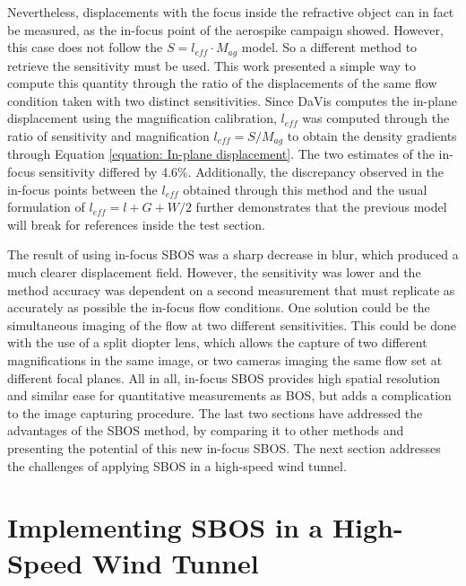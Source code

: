 Nevertheless, displacements with the focus inside the refractive object can in fact be measured, as the in-focus point of the aerospike campaign showed. However, this case does not follow the $S = l_{eff} \cdot M_{ag}$ model. So a different method to retrieve the sensitivity must be used. This work presented a simple way to compute this quantity through the ratio of the displacements of the same flow condition taken with two distinct sensitivities. Since DaVis computes the in-plane displacement using the magnification calibration, $l_{eff}$ was computed through the ratio of sensitivity and magnification $l_{eff} = S/M_{ag}$ to obtain the density gradients through Equation \ref{equation: In-plane displacement}. The two estimates of the in-focus sensitivity differed by 4.6\%. Additionally, the discrepancy observed in the in-focus points between the $l_{eff}$ obtained through this method and the usual formulation of $l_{eff} = l+G+W/2$ further demonstrates that the previous model will break for references inside the test section.

The result of using in-focus SBOS was a sharp decrease in blur, which produced a much clearer displacement field. However, the sensitivity was lower and the method accuracy was dependent on a second measurement that must replicate as accurately as possible the in-focus flow conditions. One solution could be the simultaneous imaging of the flow at two different sensitivities. This could be done with the use of a split diopter lens, which allows the capture of two different magnifications in the same image, or two cameras imaging the same flow set at different focal planes. All in all, in-focus SBOS provides high spatial resolution and similar ease for quantitative measurements as BOS, but adds a complication to the image capturing procedure. The last two sections have addressed the advantages of the SBOS method, by comparing it to other methods and presenting the potential of this new in-focus SBOS. The next section addresses the challenges of applying SBOS in a high-speed wind tunnel.

\section{Implementing SBOS in a High-Speed Wind Tunnel}
\label{section: Wind Tunnel Implementation}

